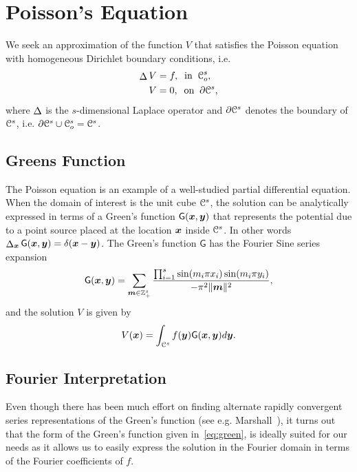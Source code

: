 \section{Poisson's Equation} 
We seek an approximation of the function $V$ that satisfies the Poisson equation with homogeneous Dirichlet boundary conditions, i.e. 
\begin{equation} \label{eq:PoissonEquation}
	\begin{split}
		\laplacian{V} &= f, \;\; \text{in} \;\; \oucube^s, \\
		V &= 0, \;\; \text{on} \;\; \partial \ucube^s,
	\end{split}
\end{equation}
where $\mathop{\Delta}$ is the $s$-dimensional Laplace operator and
$\partial \mathcal{C}^s$ denotes the boundary of $\mathcal{C}^s$,
i.e. $\partial \mathcal{C}^s \cup \mathcal{C}_o^s = \mathcal{C}^s$.

\subsection{Greens Function}
The Poisson equation is an example of a well-studied partial differential equation. When the domain of interest is the unit cube $\mathcal{C}^s$, the solution can be analytically expressed in terms of a Green's function $\mathsf{G}(\boldsymbol{x},\boldsymbol{y})$ that represents the potential due to a point source placed at the location $\boldsymbol{x}$ inside $\mathcal{C}^s$.  In other words $\mathop{\Delta}_{\boldsymbol{x}} \mathsf{G}(\boldsymbol{x},\boldsymbol{y}) = \delta(\boldsymbol{x}-\boldsymbol{y})$. The Green's function $\mathsf{G}$ has the Fourier Sine series expansion 
\begin{equation}
	\mathsf{G}(\vect{x},\vect{y}) = \sum_{\vect{m} \in \ints^s_+} 
	\frac{\prod_{i=1}^s \sin(m_i \pi x_i) \sin(m_i \pi y_i)}
	{-\pi^2 \norm{\vect{m}}^2},
	\label{eq:green}
\end{equation}
and the solution $V$ is given by
\begin{equation}
	V(\vect{x}) = \int_{\ucube^s}f(\vect{y})\mathsf{G}(\vect{x},\vect{y}) d\vect{y}.
	\label{eq:analytic}
\end{equation}


\subsection{Fourier Interpretation}

Even though there has been much effort on finding alternate rapidly
convergent series representations of the Green's function (see
e.g. Marshall~\cite{marshall99}), it turns out that the form of the
Green's function given in~\eqref{eq:green}, is ideally suited
for our needs as it allows us to easily express the solution in the
Fourier domain in terms of the Fourier coefficients of $f$.

